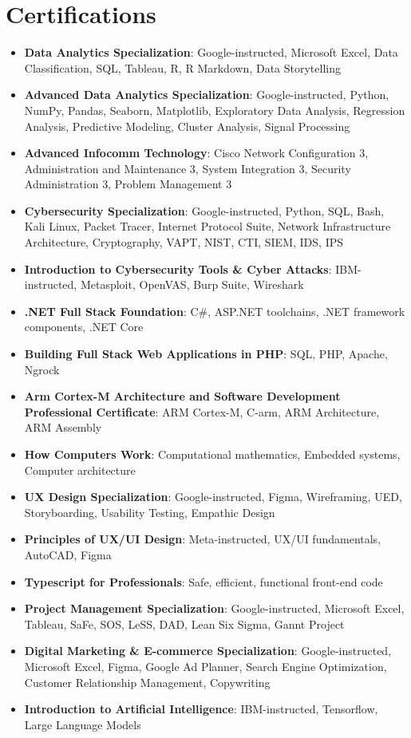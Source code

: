 \documentclass[letterpaper,11pt]{article}
\newcommand{\resumeItem}[2]{
  \item\small{
    \textbf{#1}{: #2 \vspace{-2pt}}
  }
}
\newcommand{\resumeSubItem}[2]{\resumeItem{#1}{#2}\vspace{-4pt}}
\newcommand{\resumeSubHeadingListStart}{\begin{itemize}[leftmargin=*]}
\newcommand{\resumeSubHeadingListEnd}{\end{itemize}}
\begin{document}
\section{Certifications}
 \resumeSubHeadingListStart
    \resumeSubItem{Data Analytics Specialization}
        {Google-instructed, Microsoft Excel, Data Classification, SQL, Tableau, R, R Markdown, Data Storytelling}
    \resumeSubItem{Advanced Data Analytics Specialization}
        {Google-instructed, Python, NumPy, Pandas, Seaborn, Matplotlib, Exploratory Data Analysis, Regression Analysis, Predictive Modeling, Cluster Analysis, Signal Processing}
    \resumeSubItem{Advanced Infocomm Technology}
        {Cisco Network Configuration 3, Administration and Maintenance 3, System Integration 3, Security Administration 3, Problem Management 3}
    \resumeSubItem{Cybersecurity Specialization}
        {Google-instructed, Python, SQL, Bash, Kali Linux, Packet Tracer, Internet Protocol Suite, Network Infrastructure Architecture, Cryptography, VAPT, NIST, CTI, SIEM, IDS, IPS}
    \resumeSubItem{Introduction to Cybersecurity Tools \& Cyber Attacks}
        {IBM-instructed, Metasploit, OpenVAS, Burp Suite, Wireshark}
    \resumeSubItem{.NET Full Stack Foundation}
        {C\#, ASP.NET toolchains, .NET framework components, .NET Core}
    \resumeSubItem{Building Full Stack Web Applications in PHP}
        {SQL, PHP, Apache, Ngrock}
    \resumeSubItem{Arm Cortex-M Architecture and Software Development Professional Certificate}
        {ARM Cortex-M, C-arm, ARM Architecture, ARM Assembly}
    \resumeSubItem{How Computers Work}
        {Computational mathematics, Embedded systems, Computer architecture}
    \resumeSubItem{UX Design Specialization}
        {Google-instructed, Figma, Wireframing, UED, Storyboarding, Usability Testing, Empathic Design}
    \resumeSubItem{Principles of UX/UI Design}
        {Meta-instructed, UX/UI fundamentals, AutoCAD, Figma}
    \resumeSubItem{Typescript for Professionals}
        {Safe, efficient, functional front-end code}
    \resumeSubItem{Project Management Specialization}
        {Google-instructed, Microsoft Excel, Tableau, SaFe, SOS, LeSS, DAD, Lean Six Sigma, Gannt Project}
    \resumeSubItem{Digital Marketing \& E-commerce Specialization}
        {Google-instructed, Microsoft Excel, Figma, Google Ad Planner, Search Engine Optimization, Customer Relationship Management, Copywriting}
    \resumeSubItem{Introduction to Artificial Intelligence}
        {IBM-instructed, Tensorflow, Large Language Models}
 \resumeSubHeadingListEnd
 
\end{document}
